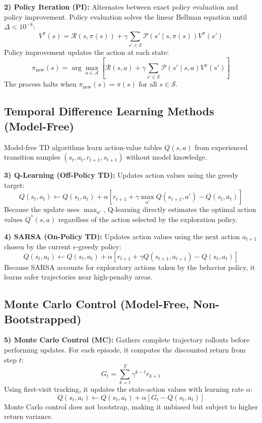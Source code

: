 \documentclass[10pt,conference]{IEEEtran}
\begin{document}
\textbf{2) Policy Iteration (PI):} Alternates between exact policy evaluation and policy improvement. Policy evaluation solves the linear Bellman equation until $\Delta < 10^{-8}$:
\begin{equation}
    V^\pi(s) = \mathcal{R}(s, \pi(s)) + \gamma \sum_{s' \in \mathcal{S}} \mathcal{P}(s' \mid s, \pi(s)) V^\pi(s')
\end{equation}
Policy improvement updates the action at each state:
\begin{equation}
    \pi_{\text{new}}(s) = \arg\max_{a \in \mathcal{A}} \left[ \mathcal{R}(s, a) + \gamma \sum_{s' \in \mathcal{S}} \mathcal{P}(s' \mid s, a) V^\pi(s') \right]
\end{equation}
The process halts when $\pi_{\text{new}}(s) = \pi(s)$ for all $s \in \mathcal{S}$.

\subsection{Temporal Difference Learning Methods (Model-Free)}
Model-free TD algorithms learn action-value tables $Q(s, a)$ from experienced transition samples $(s_t, a_t, r_{t+1}, s_{t+1})$ without model knowledge.

\textbf{3) Q-Learning (Off-Policy TD):} Updates action values using the greedy target:
\begin{equation}
    Q(s_t, a_t) \leftarrow Q(s_t, a_t) + \alpha \left[ r_{t+1} + \gamma \max_{a'} Q(s_{t+1}, a') - Q(s_t, a_t) \right]
\end{equation}
Because the update uses $\max_{a'}$, Q-learning directly estimates the optimal action values $Q^*(s, a)$ regardless of the action selected by the exploration policy.

\textbf{4) SARSA (On-Policy TD):} Updates action values using the next action $a_{t+1}$ chosen by the current $\epsilon$-greedy policy:
\begin{equation}
    Q(s_t, a_t) \leftarrow Q(s_t, a_t) + \alpha \left[ r_{t+1} + \gamma Q(s_{t+1}, a_{t+1}) - Q(s_t, a_t) \right]
\end{equation}
Because SARSA accounts for exploratory actions taken by the behavior policy, it learns safer trajectories near high-penalty areas.

\subsection{Monte Carlo Control (Model-Free, Non-Bootstrapped)}
\textbf{5) Monte Carlo Control (MC):} Gathers complete trajectory rollouts before performing updates. For each episode, it computes the discounted return from step $t$:
\begin{equation}
    G_t = \sum_{k=t}^T \gamma^{k-t} r_{k+1}
\end{equation}
Using first-visit tracking, it updates the state-action values with learning rate $\alpha$:
\begin{equation}
    Q(s_t, a_t) \leftarrow Q(s_t, a_t) + \alpha \left[ G_t - Q(s_t, a_t) \right]
\end{equation}
Monte Carlo control does not bootstrap, making it unbiased but subject to higher return variance.
\end{document}
